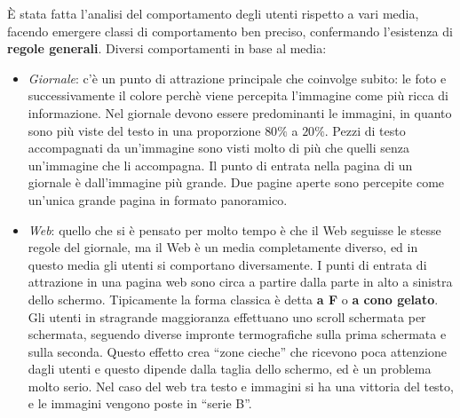 \`E stata fatta l'analisi del comportamento degli utenti rispetto a vari media, facendo emergere classi di comportamento ben preciso, confermando l'esistenza di \textbf{regole generali}. Diversi comportamenti in base al media:
\begin{itemize}

\item \textit{Giornale}: c'\`e un punto di attrazione principale che coinvolge subito: le foto e successivamente il colore perch\`e viene percepita l'immagine come pi\`u ricca di informazione. Nel giornale devono essere predominanti le immagini, in quanto sono pi\`u viste del testo in una proporzione $80\%$ a $20\%$. Pezzi di testo accompagnati da un'immagine sono visti molto di pi\`u che quelli senza un'immagine che li accompagna. Il punto di entrata nella pagina di un giornale \`e dall'immagine pi\`u grande. Due pagine aperte sono percepite come un'unica grande pagina in formato panoramico.

\item \textit{Web}: quello che si \`e pensato per molto tempo \`e che il Web seguisse le stesse regole del giornale, ma il Web \`e un media completamente diverso, ed in questo media gli utenti si comportano diversamente. I punti di entrata di attrazione in una pagina web sono circa a partire dalla parte in alto a sinistra dello schermo. Tipicamente la forma classica \`e detta \textbf{a F} o \textbf{a cono gelato}. Gli utenti in stragrande maggioranza effettuano uno scroll schermata per schermata, seguendo diverse impronte termografiche sulla prima schermata e sulla seconda. Questo effetto crea ``zone cieche'' che ricevono poca attenzione dagli utenti e questo dipende dalla taglia dello schermo, ed \`e un problema molto serio.
Nel caso del web tra testo e immagini si ha una vittoria del testo, e le immagini vengono poste in ``serie B''.


\end{itemize}
